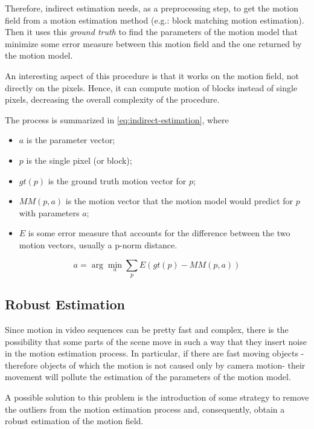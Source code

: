 Therefore, indirect estimation needs, as a preprocessing step, to get the motion field from a motion estimation method (e.g.: block matching motion estimation). Then it uses this \textit{ground truth} to find the parameters of the motion model that minimize some error measure between this motion field and the one returned by the motion model.

An interesting aspect of this procedure is that it works on the motion field, not directly on the pixels. Hence, it can compute motion of blocks instead of single pixels, decreasing the overall complexity of the procedure.

The process is summarized in \cref{eq:indirect-estimation}, where
\begin{itemize}
    \item $a$ is the parameter vector;
    \item $p$ is the single pixel (or block);
    \item $gt(p)$ is the ground truth motion vector for $p$;
    \item $MM(p,a)$ is the motion vector that the motion model would predict for $p$ with parameters $a$;
    \item $E$ is some error measure that accounts for the difference between the two motion vectors, usually a p-norm distance.
\end{itemize}

\begin{equation}
    \label{eq:indirect-estimation}
    a = \arg \min_a \sum_p E(gt(p) - MM(p, a))
\end{equation}

\subsection{Robust Estimation}
Since motion in video sequences can be pretty fast and complex, there is the possibility that some parts of the scene move in such a way that they insert noise in the motion estimation process.
In particular, if there are fast moving objects -therefore objects of which the motion is not caused only by camera motion- their movement will pollute the estimation of the parameters of the motion model.

A possible solution to this problem is the introduction of some strategy to remove the outliers from the motion estimation process and, consequently, obtain a robust estimation of the motion field.